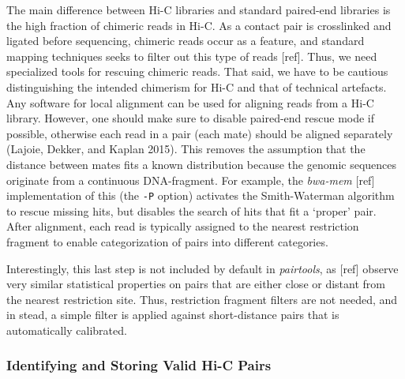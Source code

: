 \documentclass[
  11pt,
  a4paper,
]{scrbook}
\let\oldemph\emph
\renewcommand\emph[1]{\oldemph{\color{gray}#1}}
\begin{document}
The main difference between Hi-C libraries and standard paired-end
libraries is the high fraction of chimeric reads in Hi-C. As a contact
pair is crosslinked and ligated before sequencing, chimeric reads occur
as a feature, and standard mapping techniques seeks to filter out this
type of reads {[}ref{]}. Thus, we need specialized tools for rescuing
chimeric reads. That said, we have to be cautious distinguishing the
intended chimerism for Hi-C and that of technical artefacts. Any
software for local alignment can be used for aligning reads from a Hi-C
library. However, one should make sure to disable paired-end rescue mode
if possible, otherwise each read in a pair (each mate) should be aligned
separately (Lajoie, Dekker, and Kaplan 2015). This removes the
assumption that the distance between mates fits a known distribution
because the genomic sequences originate from a continuous DNA-fragment.
For example, the \emph{bwa-mem} {[}ref{]} implementation of this (the
\texttt{-P} option) activates the Smith-Waterman algorithm to rescue
missing hits, but disables the search of hits that fit a `proper' pair.
After alignment, each read is typically assigned to the nearest
restriction fragment to enable categorization of pairs into different
categories.

Interestingly, this last step is not included by default in
\emph{pairtools}, as {[}ref{]} observe very similar statistical
properties on pairs that are either close or distant from the nearest
restriction site. Thus, restriction fragment filters are not needed, and
in stead, a simple filter is applied against short-distance pairs that
is automatically calibrated.

\subsubsection{Identifying and Storing Valid Hi-C
Pairs}\label{identifying-and-storing-valid-hi-c-pairs}
\end{document}
